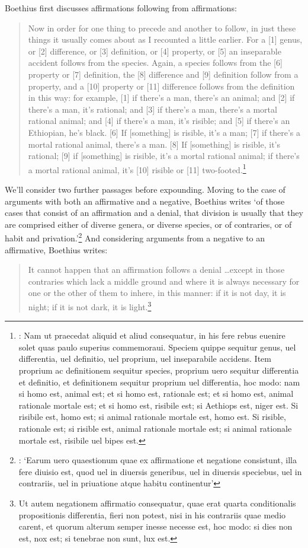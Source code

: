 \documentclass[a4paper, 11pt]{article}
\begin{document}
Boethius first discusses affirmations following from affirmations:
\begin{quote}
Now in order for one thing to precede and another to follow, in just these things it usually comes about as I recounted a little earlier. For a [1] genus, or [2] difference, or [3] definition, or [4] property, or [5] an inseparable accident follows from the species. Again, a species follows from the [6] property or [7] definition, the [8] difference and [9] definition follow from a property, and a [10] property or [11] difference follows from the definition in this way: for example, [1] if there's a man, there's an animal; and [2] if there's a man, it's rational; and [3] if there's a man, there's a mortal rational animal; and [4] if there's a man, it's risible; and [5] if there's an Ethiopian, he's black. [6] If [something] is risible, it's a man; [7] if there's a mortal rational animal, there's a man. [8] If [something] is risible, it's rational; [9] if [something] is risible, it's a mortal rational animal; if there's a mortal rational animal, it's [10] risible or [11] two-footed.\footnote{\autocite[1179A-B]{BDT}: Nam ut praecedat aliquid et aliud consequatur, in his fere rebus euenire solet quas paulo superius commemoraui. Speciem quippe sequitur genus, uel differentia, uel definitio, uel proprium, uel inseparabile accidens. Item proprium ac definitionem sequitur species, proprium uero sequitur differentia et definitio, et definitionem sequitur proprium uel differentia, hoc modo: nam si homo est, animal est; et si homo est, rationale est; et si homo est, animal rationale mortale est; et si homo est, risibile est; si Aethiops est, niger est. Si risibile est, homo est; si animal rationale mortale est, homo est. Si risible, rationale est; si risible est, animal rationale mortale est; si animal rationale mortale est, risibile uel bipes est.}
\end{quote}

We'll consider two further passages before expounding. Moving to the case of arguments with both an affirmative and a negative, Boethius writes `of those cases that consist of an affirmation and a denial, that division is usually that they are comprised either of diverse genera, or diverse species, or of contraries, or of habit and privation.'\footnote{\autocite[1179D]{BDT}: `Earum uero quaestionum quae ex affirmatione et negatione consistunt, illa fere diuisio est, quod uel in diuersis generibus, uel in diuersis speciebus, uel in contrariis, uel in priuatione atque habitu continentur'} And considering arguments from a negative to an affirmative, Boethius writes: 
\begin{quote}
It cannot happen that an affirmation follows a denial \ldots except in those contraries which lack a middle ground and where it is always necessary for one or the other of them to inhere, in this manner: if it is not day, it is night; if it is not dark, it is light.\footnote{\autocite[1180A]{BDT} Ut autem negationem affirmatio consequatur, quae erat quarta conditionalis propositionis differentia, fieri non potest, nisi in his contrariis quae medio carent, et quorum alterum semper inesse necesse est, hoc modo: si dies non est, nox est; si tenebrae non sunt, lux est.} 
\end{quote}
\end{document}
